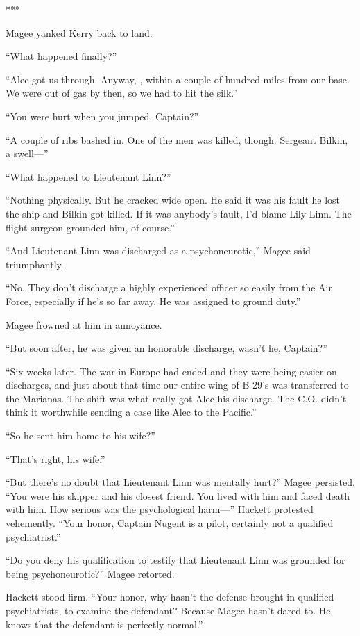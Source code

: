\documentclass{novel}
\begin{document}
***

Magee yanked Kerry back to land.

“What happened finally?”

“Alec got us through. Anyway, , within a couple of hundred miles from our base. We were out of gas by then, so we had to hit the silk.”

“You were hurt when you jumped, Captain?”

“A couple of ribs bashed in. One of the men was killed, though. Sergeant Bilkin, a swell—”

“What happened to Lieutenant Linn?”

“Nothing physically. But he cracked wide open. He said it was his fault he lost the ship and Bilkin got killed. If it was anybody’s fault, I’d blame Lily Linn. The flight surgeon grounded him, of course.”

“And Lieutenant Linn was discharged as a psychoneurotic,” Magee said triumphantly.

“No. They don’t discharge a highly experienced officer so easily from the Air Force, especially if he’s so far away. He was assigned to ground duty.”

Magee frowned at him in annoyance.

“But soon after, he was given an honorable discharge, wasn’t he, Captain?”

“Six weeks later. The war in Europe had ended and they were being easier on discharges, and just about that time our entire wing of B-29’s was transferred to the Marianas. The shift was what really got Alec his discharge. The C.O. didn’t think it worthwhile sending a case like Alec to the Pacific.”

“So he sent him home to his wife?”

“That’s right, his wife.”

“But there’s no doubt that Lieutenant Linn was mentally hurt?” Magee persisted. “You were his skipper and his closest friend. You lived with him and faced death with him. How serious was the psychological harm—” Hackett protested vehemently. “Your honor, Captain Nugent is a pilot, certainly not a qualified psychiatrist.”

“Do you deny his qualification to testify that Lieutenant Linn was grounded for being psychoneurotic?” Magee retorted.

Hackett stood firm. “Your honor, why hasn’t the defense brought in qualified psychiatrists, to examine the defendant? Because Magee hasn’t dared to. He knows that the defendant is perfectly normal.”
\end{document}
